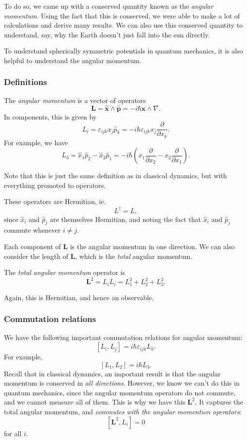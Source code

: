 \documentclass[a4paper]{article}
\begin{document}
To do so, we came up with a conserved quantity known as the \emph{angular momentum}. Using the fact that this is conserved, we were able to make a lot of calculations and derive many results. We can also use this conserved quantity to understand, say, why the Earth doesn't just fall into the sun directly.

To understand spherically symmetric potentials in quantum mechanics, it is also helpful to understand the angular momentum.
\subsubsection*{Definitions}

\begin{defi}
  The \emph{angular momentum} is a vector of operators
  \[
    \mathbf{L} = \hat{\mathbf{x}}\wedge \hat{\mathbf{p}} = -i\hbar \mathbf{x} \wedge \nabla.
  \]
  In components, this is given by
  \[
    L_i = \varepsilon_{ijk} \hat{x}_j\hat{p}_k = -i\hbar \varepsilon_{ijk} x_j \frac{\partial}{\partial x_k}.
  \]
  For example, we have
  \[
    L_3 = \hat{x}_1 \hat{p}_2 - \hat{x}_2 \hat{p}_1 = -i\hbar \left(x_1 \frac{\partial}{\partial x_2} - x_2 \frac{\partial}{\partial x_1}\right).
  \]
\end{defi}
Note that this is just the same definition as in classical dynamics, but with everything promoted to operators.

These operators are Hermitian, ie.
\[
  L^\dagger = L,
\]
since $\hat{x}_i$ and $\hat{p}_j$ are themselves Hermitian, and noting the fact that $\hat{x}_i$ and $\hat{p}_j$ commute whenever $i \not= j$.

Each component of $\mathbf{L}$ is the angular momentum in one direction. We can also consider the length of $\mathbf{L}$, which is the \emph{total} angular momentum.

\begin{defi}
  The \emph{total angular momentum} operator is
  \[
    \mathbf{L}^2 = L_i L_i = L_1^2 + L_2^2 + L_3^3.
  \]
\end{defi}
Again, this is Hermitian, and hence an observable.

\subsubsection*{Commutation relations}
We have the following important commutation relations for angular momentum:
\[
  [L_i, L_j] = i\hbar \varepsilon_{ijk} L_k.\tag{i}
\]
For example,
\[
  [L_1, L_2] = i\hbar L_3.
\]
Recall that in classical dynamics, an important result is that the angular momentum is conserved in \emph{all directions}. However, we know we can't do this in quantum mechanics, since the angular momentum operators do not commute, and we cannot measure all of them. This is why we have this $\mathbf{L}^2$. It captures the total angular momentum, and \emph{commutes with the angular momentum operators}:
\[
  [\mathbf{L}^2, L_i] = 0\tag{ii}
\]
for all $i$.
\end{document}
